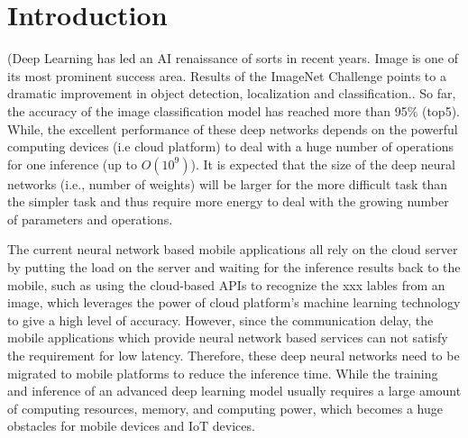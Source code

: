 \section{Introduction}

(Deep Learning has led an AI renaissance of sorts in recent years.
Image is one of its most prominent success area.
Results of the ImageNet Challenge points to a dramatic
improvement in object detection, localization and classification..
So far, the accuracy of the image classification model 
has reached more than 95\% (top5)\FIXME{\cite{}}.
While, the excellent performance of these deep networks
depends on the powerful computing devices (i.e cloud platform) 
to deal with a huge number of operations
for one inference (up to $O(10^9)$)\FIXME{\cite{}}.
It is expected that the size of the deep neural networks (i.e., number
of weights) will be larger for the more 
difficult task than the simpler task and thus require
more energy to deal with the growing number of parameters and operations.


The current neural network based mobile 
applications all rely on the cloud server 
by putting the load on the server and waiting 
for the inference results back to the mobile, 
such as \FIXME{\cite{}} using the cloud-based APIs 
to recognize the xxx lables from an image,
which leverages the power of cloud platform's machine learning
technology to give a high level of accuracy.
However, since the communication delay, the mobile applications
which provide neural network based services
can not satisfy the requirement for low latency.
Therefore, these deep neural networks 
need to be migrated to mobile platforms to reduce the 
inference time.
While the training and inference of 
an advanced deep learning model usually requires 
a large amount of computing resources, memory, 
and computing power, which becomes a huge 
obstacles for mobile devices and IoT devices.

